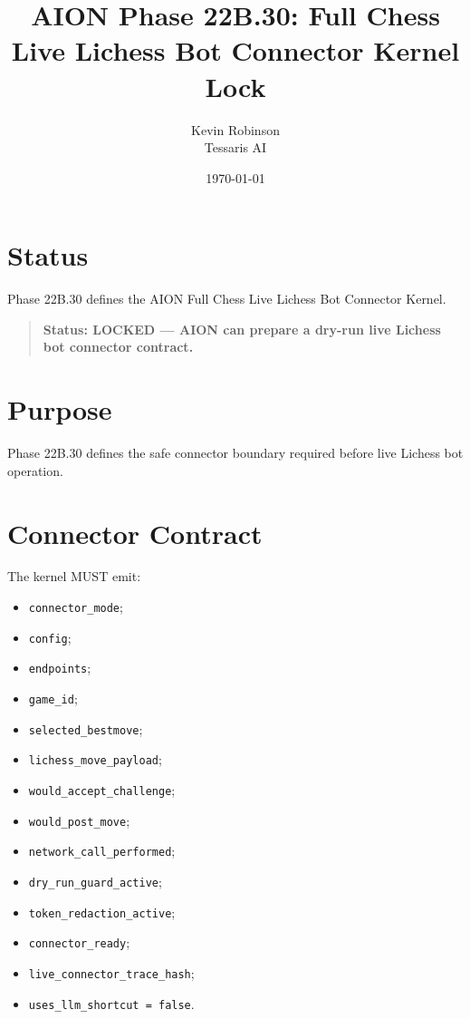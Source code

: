 \documentclass[11pt,a4paper]{article}
\title{\textbf{AION Phase 22B.30: Full Chess Live Lichess Bot Connector Kernel Lock}}
\author{Kevin Robinson\\Tessaris AI}
\date{\today}
\begin{document}
\maketitle

\section{Status}

Phase 22B.30 defines the AION Full Chess Live Lichess Bot Connector Kernel.

\begin{quote}
\textbf{Status: LOCKED --- AION can prepare a dry-run live Lichess bot connector contract.}
\end{quote}

\section{Purpose}

Phase 22B.30 defines the safe connector boundary required before live Lichess bot operation.

\section{Connector Contract}

The kernel MUST emit:

\begin{itemize}
  \item \texttt{connector\_mode};
  \item \texttt{config};
  \item \texttt{endpoints};
  \item \texttt{game\_id};
  \item \texttt{selected\_bestmove};
  \item \texttt{lichess\_move\_payload};
  \item \texttt{would\_accept\_challenge};
  \item \texttt{would\_post\_move};
  \item \texttt{network\_call\_performed};
  \item \texttt{dry\_run\_guard\_active};
  \item \texttt{token\_redaction\_active};
  \item \texttt{connector\_ready};
  \item \texttt{live\_connector\_trace\_hash};
  \item \texttt{uses\_llm\_shortcut = false}.
\end{itemize}
\end{document}
